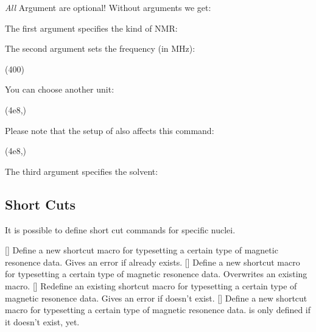 \documentclass{chemmacros-manual}
\begin{document}
\emph{All} Argument are optional! Without arguments we get:
\begin{example}
  \NMR \par
  \NMR*
\end{example}

The first argument specifies the kind of NMR:
\begin{example}
\end{example}

The second argument sets the frequency (in \si{\mega\hertz}):
\begin{example}
  \NMR(400)
\end{example}
You can choose another unit:
\begin{example}
  \NMR(4e8,\hertz)
\end{example}
Please note that the setup of  also affects this command:
\begin{example}
  \NMR(4e8,\hertz)
\end{example}

The third argument specifies the solvent:
\begin{example}
  \NMR[CDCl3]
\end{example}

\subsection{Short Cuts}

It is possible to define short cut commands for specific nuclei.
\begin{commands}
  []
    Define a new shortcut macro for typesetting a certain type of magnetic
    resonence data.  Gives an error if  already exists.
  []
    Define a new shortcut macro for typesetting a certain type of magnetic
    resonence data.  Overwrites an existing macro.
  []
    Redefine an existing shortcut macro for typesetting a certain type of
    magnetic resonence data.  Gives an error if  doesn't exist.
  []
    Define a new shortcut macro for typesetting a certain type of magnetic
    resonence data.   is only defined if it doesn't exist, yet.
\end{commands}
\end{document}
